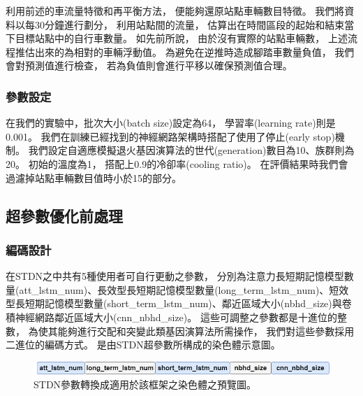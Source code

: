 \documentclass[a4paper,14pt]{extarticle}
\begin{document}
                利用前述的車流量特徵和再平衡方法，
                便能夠還原站點車輛數目特徵。
                我們將資料以每30分鐘進行劃分，
                利用站點間的流量，
                估算出在時間區段的起始和結束當下目標站點中的自行車數量。
                如先前所說，
                由於沒有實際的站點車輛數，
                上述流程推估出來的為相對的車輛浮動值。
                為避免在逆推時造成腳踏車數量負值，
                我們會對預測值進行檢查，
                若為負值則會進行平移以確保預測值合理。

            \subsubsection{參數設定}
                \label{subsec:parameters_setting}
                在我們的實驗中，批次大小(batch size)設定為64，
                學習率(learning rate)則是0.001。
                我們在訓練已經找到的神經網路架構時搭配了使用了停止(early stop)機制。
                我們設定自適應模擬退火基因演算法的世代(generation)數目為10、族群則為20。
                初始的溫度為1，
                搭配上0.9的冷卻率(cooling ratio)。
                在評價結果時我們會過濾掉站點車輛數目值時小於15的部分。

            \subsection{超參數優化前處理}
                \subsubsection{編碼設計}

                    在STDN之中共有5種使用者可自行更動之參數，
                    分別為注意力長短期記憶模型數量(att\_lstm\_num)、長效型長短期記憶模型數量(long\_term\_lstm\_num)、短效型長短期記憶模型數量(short\_term\_lstm\_num)、鄰近區域大小(nbhd\_size)與卷積神經網路鄰近區域大小(cnn\_nbhd\_size)。
                    這些可調整之參數都是十進位的整數，
                    為使其能夠進行交配和突變此類基因演算法所需操作，
                    我們對這些參數採用二進位的編碼方式。
                    是由STDN超參數所構成的染色體示意圖。
                    \begin{figure}[htbp]
                        \centering
                        \includegraphics[width=\textwidth]{chromosome_sheme.png}
                        \caption{
                            STDN參數轉換成適用於該框架之染色體之預覽圖。
                        }
                        \label{fig:chromosome_sheme}
                    \end{figure}
\end{document}
